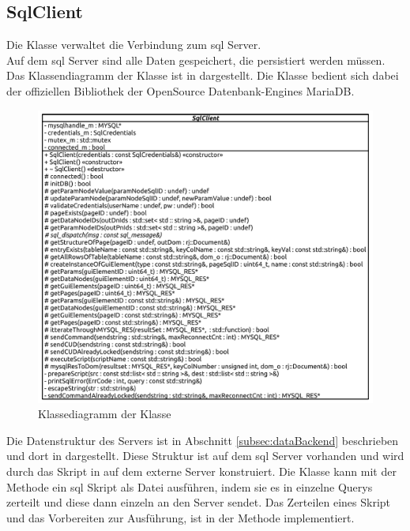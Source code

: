 \subsection{SqlClient}
Die  Klasse verwaltet die Verbindung zum \ac{sql} Server. \\Auf dem \ac{sql} Server sind alle Daten gespeichert, die persistiert werden müssen. 
Das Klassendiagramm der  Klasse ist in  dargestellt.
Die Klasse bedient sich dabei der offiziellen Bibliothek  der OpenSource Datenbank-Engines MariaDB.
\begin{figure}[ht]
  \centering
  \includegraphics[width=\textwidth]{content/hauptteil/umsetzungPoC/backend/uml/classesOfOverview/SqlClient.pdf}
  \caption{Klassediagramm der Klasse }
  \label{fig:backend:classDiag:SqlClient}
\end{figure}
Die Datenstruktur des Servers ist in Abschnitt \ref{subsec:dataBackend} beschrieben und dort in  dargestellt.
Diese Struktur ist auf dem \ac{sql} Server vorhanden und wird durch das Skript in  auf dem externe Server konstruiert.
Die  Klasse kann mit der Methode  ein \ac{sql} Skript als Datei ausführen, indem sie es in einzelne Querys zerteilt und diese dann einzeln an den Server sendet.
Das Zerteilen eines Skript und das Vorbereiten zur Ausführung, ist in der Methode  implementiert. 
